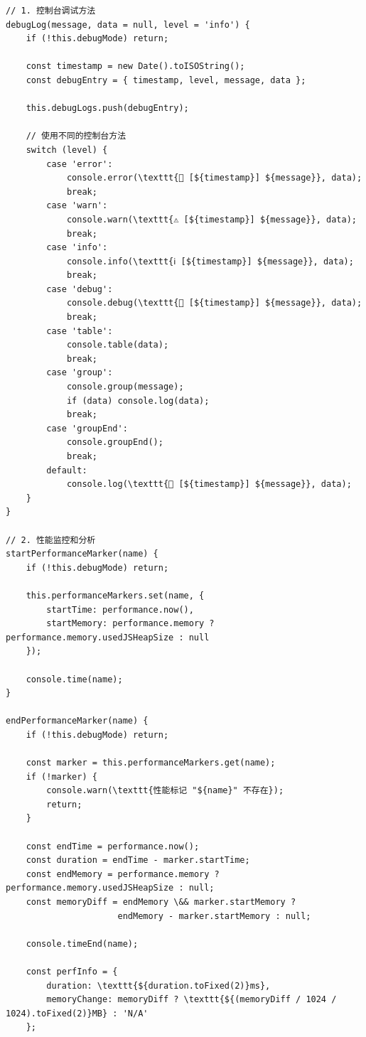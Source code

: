 {{\begin{verbatim}
// 1. 控制台调试方法
debugLog(message, data = null, level = 'info') {
    if (!this.debugMode) return;
    
    const timestamp = new Date().toISOString();
    const debugEntry = { timestamp, level, message, data };
    
    this.debugLogs.push(debugEntry);
    
    // 使用不同的控制台方法
    switch (level) {
        case 'error':
            console.error(\texttt{🚨 [${timestamp}] ${message}}, data);
            break;
        case 'warn':
            console.warn(\texttt{⚠️ [${timestamp}] ${message}}, data);
            break;
        case 'info':
            console.info(\texttt{ℹ️ [${timestamp}] ${message}}, data);
            break;
        case 'debug':
            console.debug(\texttt{🐛 [${timestamp}] ${message}}, data);
            break;
        case 'table':
            console.table(data);
            break;
        case 'group':
            console.group(message);
            if (data) console.log(data);
            break;
        case 'groupEnd':
            console.groupEnd();
            break;
        default:
            console.log(\texttt{📝 [${timestamp}] ${message}}, data);
    }
}

// 2. 性能监控和分析
startPerformanceMarker(name) {
    if (!this.debugMode) return;
    
    this.performanceMarkers.set(name, {
        startTime: performance.now(),
        startMemory: performance.memory ? performance.memory.usedJSHeapSize : null
    });
    
    console.time(name);
}

endPerformanceMarker(name) {
    if (!this.debugMode) return;
    
    const marker = this.performanceMarkers.get(name);
    if (!marker) {
        console.warn(\texttt{性能标记 "${name}" 不存在});
        return;
    }
    
    const endTime = performance.now();
    const duration = endTime - marker.startTime;
    const endMemory = performance.memory ? performance.memory.usedJSHeapSize : null;
    const memoryDiff = endMemory \&& marker.startMemory ? 
                      endMemory - marker.startMemory : null;
    
    console.timeEnd(name);
    
    const perfInfo = {
        duration: \texttt{${duration.toFixed(2)}ms},
        memoryChange: memoryDiff ? \texttt{${(memoryDiff / 1024 / 1024).toFixed(2)}MB} : 'N/A'
    };
    

\end{verbatim}}}
